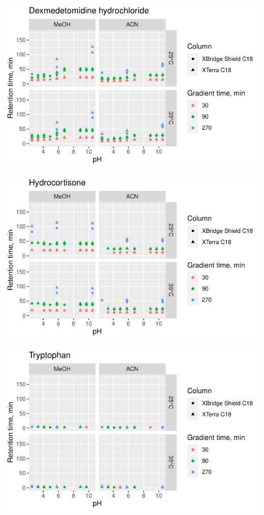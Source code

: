 \documentclass[
  letterpaper,
  DIV=11,
  numbers=noendperiod]{scrreprt}
\begin{document}
\includegraphics{index_files/figure-pdf/unnamed-chunk-4-99.pdf}

\includegraphics{index_files/figure-pdf/unnamed-chunk-4-100.pdf}

\includegraphics{index_files/figure-pdf/unnamed-chunk-4-101.pdf}
\end{document}
